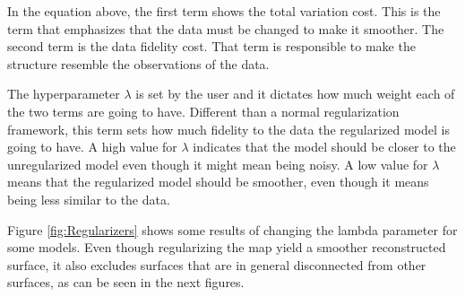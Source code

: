 \documentclass[12pt]{article}
\begin{document}
In the equation above, the first term shows the total variation cost. This is the term that emphasizes that the data must be changed to make it smoother. The second term is the data fidelity cost. That term is responsible to make the structure resemble the observations of the data.

The hyperparameter $\lambda$ is set by the user and it dictates how much weight each of the two terms are going to have. Different than a normal regularization framework, this term sets how much fidelity to the data the regularized model is going to have. A high value for $\lambda$ indicates that the model should be closer to the unregularized model even though it might mean being noisy. A low value for $\lambda$ means that the regularized model should be smoother, even though it means being less similar to the data.

Figure \ref{fig:Regularizers} shows some results of changing the lambda parameter for some models. Even though regularizing the map yield a smoother reconstructed surface, it also excludes surfaces that are in general disconnected from other surfaces, as can be seen in the next figures.
\end{document}
